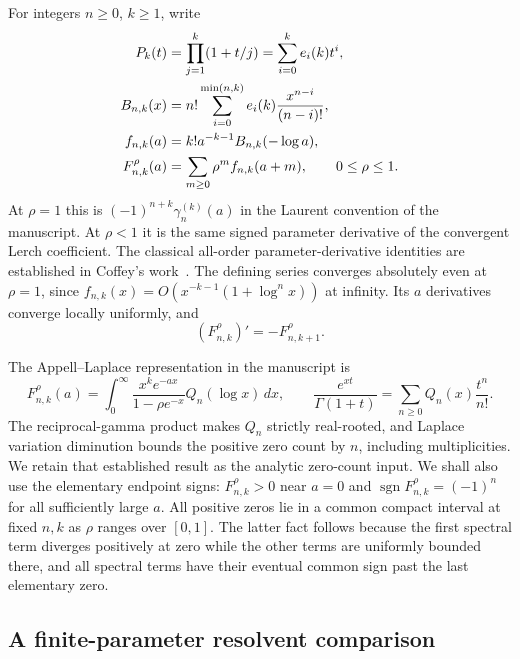 \documentclass[11pt,a4paper]{article}
\numberwithin{equation}{section}
\theoremstyle{definition}
\theoremstyle{remark}
\begin{document}
For integers $n\geq0$, $k\geq1$, write
\begin{align}
 P_k(t)&=\prod_{j=1}^k(1+t/j)=\sum_{i=0}^k e_i(k)t^i,\notag\\
 B_{n,k}(x)&=n!\sum_{i=0}^{\min(n,k)}e_i(k)\frac{x^{n-i}}{(n-i)!},\notag\\
 f_{n,k}(a)&=k!a^{-k-1}B_{n,k}(-\log a),\label{lershape:eq:elementary}\\
 F_{n,k}^{\rho}(a)&=\sum_{m\geq0}\rho^m f_{n,k}(a+m),
 \qquad 0\leq\rho\leq1.\label{lershape:eq:spectral}
\end{align}
At $\rho=1$ this is $(-1)^{n+k}\gamma_n^{(k)}(a)$ in the
Laurent convention of the manuscript. At $\rho<1$ it is the same signed
parameter derivative of the convergent Lerch coefficient. The classical
all-order parameter-derivative identities are established in
Coffey's work~\cite{lershape:Coffey}. The defining
series converges absolutely even at $\rho=1$, since
$f_{n,k}(x)=O(x^{-k-1}(1+\log^n x))$ at infinity. Its $a$ derivatives
converge locally uniformly, and
\begin{equation}\label{lershape:eq:a-derivative}
 (F_{n,k}^{\rho})'=-F_{n,k+1}^{\rho}.
\end{equation}

The Appell--Laplace representation in the manuscript is
\begin{equation}\label{lershape:eq:laplace}
 F_{n,k}^{\rho}(a)=\int_0^\infty
 \frac{x^ke^{-ax}}{1-\rho e^{-x}}Q_n(\log x)\,dx,
 \qquad
 \frac{e^{xt}}{\Gamma(1+t)}=\sum_{n\geq0}Q_n(x)\frac{t^n}{n!}.
\end{equation}
The reciprocal-gamma product makes $Q_n$ strictly real-rooted, and
Laplace variation diminution bounds the positive zero count by $n$,
including multiplicities. We retain that established result as the
analytic zero-count input. We shall also use the elementary endpoint
signs: $F_{n,k}^{\rho}>0$ near $a=0$ and
$\operatorname{sgn}F_{n,k}^{\rho}=(-1)^n$ for all sufficiently large $a$.
All positive zeros lie in a common compact interval at fixed $n,k$ as
$\rho$ ranges over $[0,1]$. The latter fact follows because the first
spectral term diverges positively at zero while the other terms are
uniformly bounded there, and all spectral terms have their eventual
common sign past the last elementary zero.

\subsection{A finite-parameter resolvent comparison}
\end{document}
